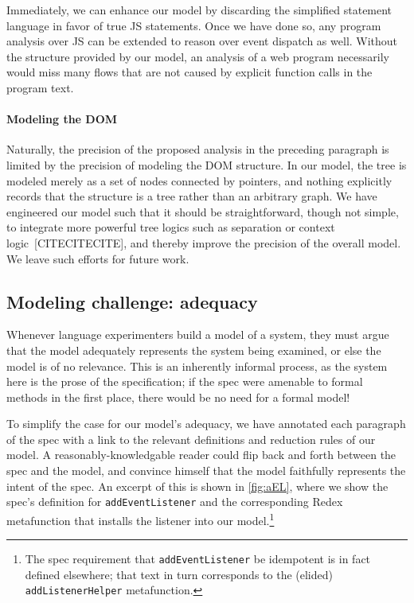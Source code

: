 \documentclass[letterpaper,10pt,twocolumn]{article}
\newcommand{\quot}{\mbox{\tt\char'042}}
\newcommand{\wild}{\mbox{\tt\char'137}}
\newcommand{\impl}[1]{{\def\_{\wild}\def\"{\quot}\tt#1}}
\DeclareRobustCommand{\spec}[1]{\textsf{#1}\xspace}
\DeclareRobustCommand\JS{\spec{JS}}
\begin{document}
Immediately, we can enhance our model by discarding the simplified
statement language in favor of true \JS statements.  Once we have done
so, any program analysis over \JS can be extended to reason over event
dispatch as well.  Without the structure provided by our model, an
analysis of a web program necessarily would miss many flows that are
not caused by explicit function calls in the program text.

\paragraph{Modeling the DOM} Naturally, the precision of the proposed
analysis in the preceding paragraph is limited by the precision of
modeling the DOM structure.  In our model, the tree is modeled merely
as a set of nodes connected by pointers, and nothing explicitly
records that the structure is a tree rather than an arbitrary graph.
We have engineered our model such that it should be straightforward,
though not simple, to integrate more powerful tree logics such as
separation or context logic~[CITECITECITE], and thereby improve the
precision of the overall model.  We leave such efforts for future
work.

\subsection{Modeling challenge: adequacy}
Whenever language experimenters build a model of a system, they must
argue that the model adequately represents the system being examined,
or else the model is of no relevance.  This is an inherently informal
process, as the system here is the prose of the specification; if the
spec were amenable to formal methods in the first place, there would
be no need for a formal model!

To simplify the case for our model's adequacy, we have annotated each
paragraph of the spec with a link to the relevant definitions and
reduction rules of our model.  A reasonably-knowledgable reader could
flip back and forth between the spec and the model, and convince
himself that the model faithfully represents the intent of the spec.
An excerpt of this is shown in \cref{fig:aEL}, where we show the
spec's definition for \impl{addEventListener} and the corresponding
Redex metafunction that installs the listener into our
model.\footnote{The spec requirement that \impl{addEventListener} be
  idempotent is in fact defined elsewhere; that text in turn
  corresponds to the (elided) \impl{addListenerHelper} metafunction.}
\end{document}
